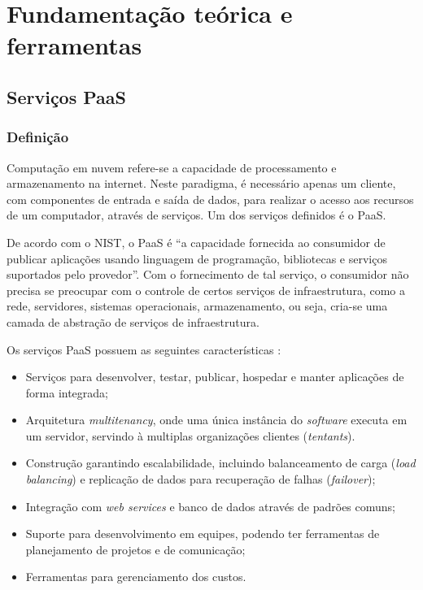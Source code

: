 \chapter{Fundamentação teórica e ferramentas} \label{CHP:FUND}

\section{Serviços PaaS}
\subsection{Definição}

	 Computação em nuvem refere-se a capacidade de processamento e armazenamento na internet. Neste paradigma, é necessário apenas um cliente, com componentes de entrada e saída de dados, para realizar o acesso aos recursos de um computador, através de serviços. Um dos serviços definidos é o \ac{PaaS}.

	De acordo com o \ac{NIST}, o \ac{PaaS} é ``a capacidade fornecida ao consumidor de publicar aplicações usando linguagem de programação, bibliotecas e serviços suportados pelo provedor''. Com o fornecimento de tal serviço, o consumidor não precisa se preocupar com o controle de certos serviços de infraestrutura, como a rede, servidores, sistemas operacionais, armazenamento, ou seja, cria-se uma camada de abstração de serviços de infraestrutura.
	
	Os serviços \ac{PaaS} possuem as seguintes características \cite{cloudstack}:
\begin{itemize}
\item Serviços para desenvolver, testar, publicar, hospedar e manter aplicações de forma integrada;
\item Arquitetura \emph{multitenancy}, onde uma única instância do \emph{software} executa em um servidor, servindo à multiplas organizações clientes (\emph{tentants}).
\item Construção garantindo escalabilidade, incluindo balanceamento de carga (\emph{load balancing}) e replicação de dados para recuperação de falhas (\emph{failover});
\item Integração com \emph{web services} e banco de dados através de padrões comuns;
\item Suporte para desenvolvimento em equipes, podendo ter ferramentas de planejamento de projetos e de comunicação;
\item Ferramentas para gerenciamento dos custos.
\end{itemize}

